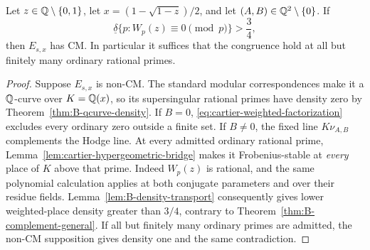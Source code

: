 \begin{theorem}
\label{thm:weighted-density-cm}
Let $z\in\mathbb Q\setminus\{0,1\}$, let
$x=(1-\sqrt{1-z})/2$, and let $(A,B)\in\mathbb Q^2\setminus\{0\}$.
If
\[
       \underline\delta\{p:W_p(z)\equiv0\pmod p\}>\frac34,
\]
then $E_{s,x}$ has CM.  In particular it suffices that the
congruence hold at all but finitely many ordinary rational primes.
\end{theorem}
\begin{proof}
Suppose $E_{s,x}$ is non-CM.  The standard modular correspondences
make it a $\mathbb Q$-curve over $K=\mathbb Q(x)$, so its supersingular rational
primes have density zero by Theorem~\ref{thm:B-qcurve-density}.
If $B=0$, \eqref{eq:cartier-weighted-factorization} excludes every
ordinary zero outside a finite set.  If $B\ne0$, the fixed line
$K\nu_{A,B}$ complements the Hodge line.  At every admitted
ordinary rational prime, Lemma~\ref{lem:cartier-hypergeometric-bridge}
makes it Frobenius-stable at \emph{every} place of $K$ above that
prime.  Indeed $W_p(z)$ is rational, and the same polynomial
calculation applies at both conjugate parameters and over their
residue fields.  Lemma~\ref{lem:B-density-transport} consequently
gives lower weighted-place density greater than $3/4$, contrary to
Theorem~\ref{thm:B-complement-general}.  If all but finitely many
ordinary primes are admitted, the non-CM supposition gives density
one and the same contradiction.
\end{proof}

